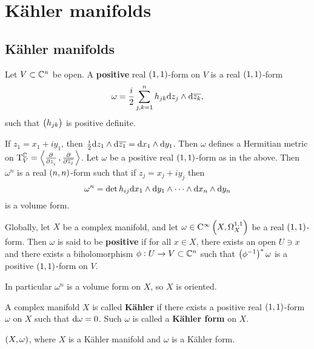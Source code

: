 \pagebreak

\section{K\"ahler manifolds}

\subsection{K\"ahler manifolds}

\begin{definition}
Let $ V \subset \mathbb{C}^n $ be open. A \textbf{positive} real $ \br{1, 1} $-form on $ V $ is a real $ \br{1, 1} $-form
$$ \omega = \dfrac{i}{2}\sum_{j, k = 1}^n h_{jk} \mathrm{d} z_j \wedge \mathrm{d}\overline{z_k}, $$
such that $ \br{h_{jk}} $ is positive definite.
\end{definition}

If $ z_1 = x_1 + iy_1 $, then $ \tfrac{i}{2} \mathrm{d} z_1 \wedge \mathrm{d}\overline{z_1} = \mathrm{d} x_1 \wedge \mathrm{d} y_1 $. Then $ \omega $ defines a Hermitian metric on $ \T_V^\CC = \abr{\tpd{}{z_i}, \tpd{}{\overline{z_j}}} $. Let $ \omega $ be a positive real $ \br{1, 1} $-form as in the above. Then $ \omega^n $ is a real $ \br{n, n} $-form such that if $ z_j = x_j + iy_j $ then
$$ \omega^n = \det h_{ij} \mathrm{d} x_1 \wedge \mathrm{d} y_1 \wedge \dots \wedge \mathrm{d} x_n \wedge \mathrm{d} y_n $$
is a volume form.

\begin{definition}
Globally, let $ X $ be a complex manifold, and let $ \omega \in \C^\infty\br{X, \Omega_X^{1, 1}} $ be a real $ \br{1, 1} $-form. Then $ \omega $ is said to be \textbf{positive} if for all $ x \in X $, there exists an open $ U \ni x $ and there exists a biholomorphism $ \phi : U \to V \subset \mathbb{C}^n $ such that $ \br{\phi^{-1}}^*\omega $ is a positive $ \br{1, 1} $-form on $ V $.
\end{definition}

In particular $ \omega^n $ is a volume form on $ X $, so $ X $ is oriented.

\begin{definition}
A complex manifold $ X $ is called \textbf{K\"ahler} if there exists a positive real $ \br{1, 1} $-form $ \omega $ on $ X $ such that $ \mathrm{d}\omega = 0 $. Such $ \omega $ is called a \textbf{K\"ahler form} on $ X $.
\end{definition}

\begin{notation*}
$ \br{X, \omega} $, where $ X $ is a K\"ahler manifold and $ \omega $ is a K\"ahler form.
\end{notation*}

